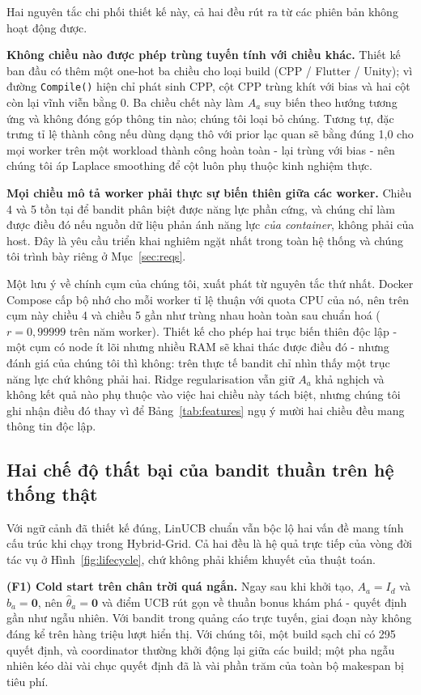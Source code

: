 \documentclass[final,5p,times,twocolumn]{elsarticle}
\begin{document}
Hai nguyên tắc chi phối thiết kế này, cả hai đều rút ra từ các phiên bản không hoạt động được.

\textbf{Không chiều nào được phép trùng tuyến tính với chiều khác.} Thiết kế ban đầu có thêm một one-hot ba chiều cho loại build (CPP / Flutter / Unity); vì đường \texttt{Compile()} hiện chỉ phát sinh CPP, cột CPP trùng khít với bias và hai cột còn lại vĩnh viễn bằng 0. Ba chiều chết này làm $A_a$ suy biến theo hướng tương ứng và không đóng góp thông tin nào; chúng tôi loại bỏ chúng. Tương tự, đặc trưng tỉ lệ thành công nếu dùng dạng thô với prior lạc quan sẽ bằng đúng 1,0 cho mọi worker trên một workload thành công hoàn toàn - lại trùng với bias - nên chúng tôi áp Laplace smoothing để cột luôn phụ thuộc kinh nghiệm thực.

\textbf{Mọi chiều mô tả worker phải thực sự biến thiên giữa các worker.} Chiều 4 và 5 tồn tại để bandit phân biệt được năng lực phần cứng, và chúng chỉ làm được điều đó nếu nguồn dữ liệu phản ánh năng lực \emph{của container}, không phải của host. Đây là yêu cầu triển khai nghiêm ngặt nhất trong toàn hệ thống và chúng tôi trình bày riêng ở Mục~\ref{sec:reqs}.

Một lưu ý về chính cụm của chúng tôi, xuất phát từ nguyên tắc thứ nhất. Docker Compose cấp bộ nhớ cho mỗi worker tỉ lệ thuận với quota CPU của nó, nên trên cụm này chiều 4 và chiều 5 gần như trùng nhau hoàn toàn sau chuẩn hoá ($r=0{,}99999$ trên năm worker). Thiết kế cho phép hai trục biến thiên độc lập - một cụm có node ít lõi nhưng nhiều RAM sẽ khai thác được điều đó - nhưng đánh giá của chúng tôi thì không: trên thực tế bandit chỉ nhìn thấy một trục năng lực chứ không phải hai. Ridge regularisation vẫn giữ $A_a$ khả nghịch và không kết quả nào phụ thuộc vào việc hai chiều này tách biệt, nhưng chúng tôi ghi nhận điều đó thay vì để Bảng~\ref{tab:features} ngụ ý mười hai chiều đều mang thông tin độc lập.

\subsection{Hai chế độ thất bại của bandit thuần trên hệ thống thật}
\label{sec:failures}

Với ngữ cảnh đã thiết kế đúng, LinUCB chuẩn vẫn bộc lộ hai vấn đề mang tính cấu trúc khi chạy trong Hybrid-Grid. Cả hai đều là hệ quả trực tiếp của vòng đời tác vụ ở Hình~\ref{fig:lifecycle}, chứ không phải khiếm khuyết của thuật toán.

\textbf{(F1) Cold start trên chân trời quá ngắn.} Ngay sau khi khởi tạo, $A_a=I_d$ và $b_a=\mathbf{0}$, nên $\hat\theta_a=\mathbf{0}$ và điểm UCB rút gọn về thuần bonus khám phá - quyết định gần như ngẫu nhiên. Với bandit trong quảng cáo trực tuyến, giai đoạn này không đáng kể trên hàng triệu lượt hiển thị. Với chúng tôi, một build sạch chỉ có 295 quyết định, và coordinator thường khởi động lại giữa các build; một pha ngẫu nhiên kéo dài vài chục quyết định đã là vài phần trăm của toàn bộ makespan bị tiêu phí.
\end{document}
